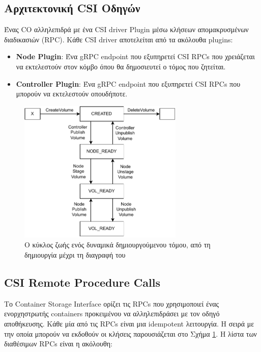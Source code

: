 \subsection{Αρχιτεκτονική CSI Οδηγών}
Ένας CO αλληλεπιδρά με ένα CSI driver Plugin μέσω κλήσεων απομακρυσμένων
διαδικασιών (RPC). Κάθε CSI driver αποτελείται από τα ακόλουθα plugins:

\begin{itemize}
      \tightlist
      \item
            \textbf{Node Plugin}: Ένα gRPC endpoint που εξυπηρετεί CSI RPCs που
            χρειάζεται να εκτελεστούν στον κόμβο όπου θα δημοσιευτεί ο τόμος
            που ζητείται.
      \item
            \textbf{Controller Plugin}: Ένα  gRPC endpoint που εξυπηρετεί CSI
            RPCs που μπορούν να εκτελεστούν οπουδήποτε.
\end{itemize}

\begin{figure}[ht]
      \centering
      \includegraphics[width=0.7\textwidth]{resources/csi-states.pdf}
      \caption{Ο κύκλος ζωής ενός δυναμικά δημιουργούμενου τόμου, από τη δημιουργία μέχρι τη διαγραφή του}
      \label{figure:csi-lifecycle-gr}
\end{figure}

\subsection{CSI Remote Procedure Calls}

Το Container Storage Interface ορίζει τις RPCs που χρησιμοποιεί ένας
ενορχηστρωτής containers προκειμένου να αλληλεπιδράσει με τον οδηγό αποθήκευσης.
Κάθε μία από τις RPCs είναι μια idempotent λειτουργία. Η σειρά με την οποία
μπορούν να εκδοθούν οι κλήσεις παρουσιάζεται στο Σχήμα
\ref{figure:csi-lifecycle-gr}. Η λίστα των διαθέσιμων RPCs είναι η ακόλουθη:

